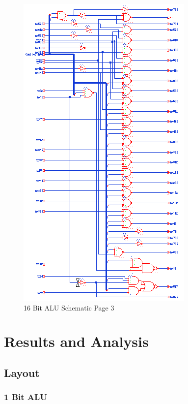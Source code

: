 \documentclass[11pt]{article}
\begin{document}
			\begin{figure}[H]
				\centering
				\includegraphics[width=0.7\linewidth]{"Pictures/ALU-16Bit Schematic 3"}
				\caption{16 Bit ALU Schematic Page 3}
				\label{fig:alu-16bit-schematic-3}
			\end{figure}


\section{Results and Analysis}
		
		
	\subsection{Layout}
	
		\subsubsection{1 Bit ALU}
		
\end{document}
